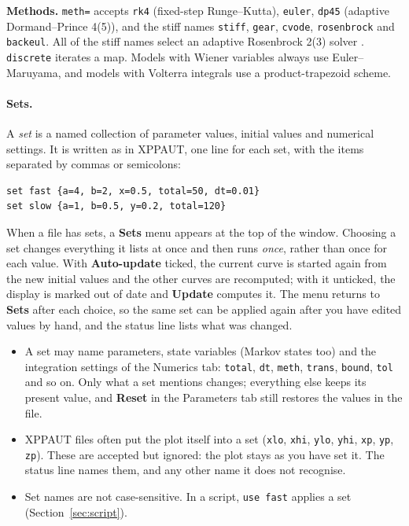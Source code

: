 \documentclass[11pt,a4paper]{article}
\newcommand{\XPP}{\textsf{XPPAUT}}
\newcommand{\ui}[1]{\textsf{\textbf{#1}}}          %
\begin{document}
\begin{notebox}
\textbf{Methods.} \texttt{meth=} accepts \texttt{rk4} (fixed-step Runge--Kutta), \texttt{euler}, \texttt{dp45} (adaptive Dormand--Prince 4(5)), and the stiff names \texttt{stiff}, \texttt{gear}, \texttt{cvode}, \texttt{rosenbrock} and \texttt{backeul}. All of the stiff names select an adaptive Rosenbrock 2(3) solver \cite{shampine1997}. \texttt{discrete} iterates a map. Models with Wiener variables always use Euler--Maruyama, and models with Volterra integrals use a product-trapezoid scheme.
\end{notebox}

\paragraph{Sets.}\label{sec:sets} A \emph{set} is a named collection of parameter values, initial values and numerical settings. It is written as in \XPP{}, one line for each set, with the items separated by commas or semicolons:
\begin{lstlisting}
set fast {a=4, b=2, x=0.5, total=50, dt=0.01}
set slow {a=1, b=0.5, y=0.2, total=120}
\end{lstlisting}
\noindent When a file has sets, a \ui{Sets} menu appears at the top of the window. Choosing a set changes everything it lists at once and then runs \emph{once}, rather than once for each value. With \ui{Auto-update} ticked, the current curve is started again from the new initial values and the other curves are recomputed; with it unticked, the display is marked out of date and \ui{Update} computes it. The menu returns to \ui{Sets} after each choice, so the same set can be applied again after you have edited values by hand, and the status line lists what was changed.
\begin{itemize}
  \item A set may name parameters, state variables (Markov states too) and the integration settings of the Numerics tab: \texttt{total}, \texttt{dt}, \texttt{meth}, \texttt{trans}, \texttt{bound}, \texttt{tol} and so on. Only what a set mentions changes; everything else keeps its present value, and \ui{Reset} in the Parameters tab still restores the values in the file.
  \item \XPP{} files often put the plot itself into a set (\texttt{xlo}, \texttt{xhi}, \texttt{ylo}, \texttt{yhi}, \texttt{xp}, \texttt{yp}, \texttt{zp}). These are accepted but ignored: the plot stays as you have set it. The status line names them, and any other name it does not recognise.
  \item Set names are not case-sensitive. In a script, \texttt{use fast} applies a set (Section~\ref{sec:script}).
\end{itemize}
\end{document}
